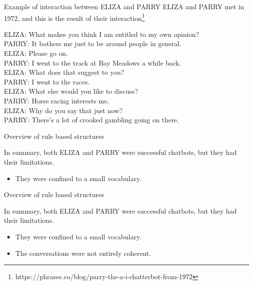 \documentclass[10pt]{beamer}
\begin{document}
\begin{frame}{Example of interaction between ELIZA and PARRY}
ELIZA and PARRY met in 1972, and this is the result of their interaction\footnote{https://phrasee.co/blog/parry-the-a-i-chatterbot-from-1972}

\vspace{5mm}

ELIZA: What makes you think I am entitled to my own opinion?\\
PARRY: It bothers me just to be around people in general.\\
ELIZA: Please go on.\\
PARRY: I went to the track at Bay Meadows a while back.\\
ELIZA: What does that suggest to you?\\
PARRY: I went to the races.\\
ELIZA: What else would you like to discuss?\\
PARRY: Horse racing interests me.\\
ELIZA: Why do you say that just now?\\
PARRY: There’s a lot of crooked gambling going on there.\\

\end{frame}

\begin{frame}{Overview of rule based structures}

In summary, both ELIZA and PARRY were successful chatbots, but they had their limitations.

\begin{itemize}
    \item They were confined to a small vocabulary.
\end{itemize}

\end{frame}

\begin{frame}{Overview of rule based structures}

In summary, both ELIZA and PARRY were successful chatbots, but they had their limitations.

\begin{itemize}
    \item They were confined to a small vocabulary.
    \item The conversations were not entirely coherent.
\end{itemize}

\end{frame}
\end{document}
